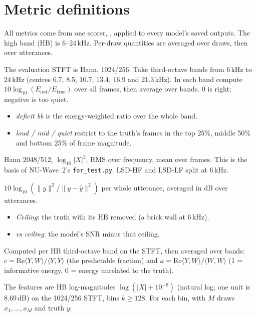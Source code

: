 \documentclass[10pt,letterpaper]{article}
\newcommand{\file}[1]{\path{#1}}
\begin{document}
\section{Metric definitions}\label{sec:metrics}

All metrics come from one scorer, \file{code/sota/score.py}, applied to every model's saved outputs. The high
band (HB) is 6--24\,kHz. Per-draw quantities are averaged over draws, then over utterances.
\begin{description}[leftmargin=1.2em,style=nextline]
\item[Deficit] The evaluation STFT is Hann, 1024/256. Take third-octave bands from 6\,kHz to 24\,kHz
(centres 6.7, 8.5, 10.7, 13.4, 16.9 and 21.3\,kHz). In each band compute $10\log_{10}(E_{\mathrm{out}}/E_{\mathrm{true}})$
over all frames, then average over bands. 0 is right; negative is too quiet.
\begin{itemize}
\item \emph{deficit bb} is the energy-weighted ratio over the whole band.
\item \emph{loud / mid / quiet} restrict to the truth's frames in the top 25\%, middle 50\% and bottom 25\% of
frame magnitude.
\end{itemize}
\item[LSD] Hann 2048/512, $\log_{10}|X|^2$, RMS over frequency, mean over frames. This is the basis of NU-Wave~2's
\texttt{for\_test.py}. LSD-HF and LSD-LF split at 6\,kHz.
\item[SNR] $10\log_{10}(\|y\|^2/\|y-\hat y\|^2)$ per whole utterance, averaged in dB over utterances.
\begin{itemize}
\item \emph{Ceiling}: the truth with its HB removed (a brick wall at 6\,kHz).
\item \emph{vs ceiling}: the model's SNR minus that ceiling.
\end{itemize}
\item[Coherent fraction, $\kappa$] Computed per HB third-octave band on the STFT, then averaged over bands:
$c=\mathrm{Re}\langle Y,W\rangle/\langle Y,Y\rangle$ (the predictable fraction) and
$\kappa=\mathrm{Re}\langle Y,W\rangle/\langle W,W\rangle$ (1 = informative energy, 0 = energy unrelated to the truth).
\item[CRPS] The features are HB log-magnitudes $\log(|X|+10^{-8})$ (natural log; one unit is 8.69\,dB) on the
1024/256 STFT, bins $k\ge128$. For each bin, with $M$ draws $x_1,\dots,x_M$ and truth $y$:

\end{description}
\end{document}
